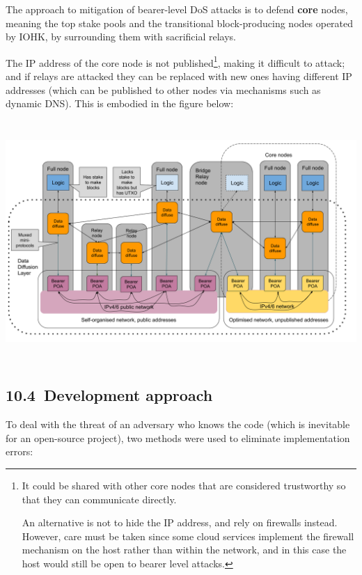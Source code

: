 \documentclass[11pt,a4paper]{article}
\begin{document}
The approach to mitigation of bearer-level DoS attacks is to defend
\textbf{core} nodes, meaning the top stake pools and the transitional
block-producing nodes operated by IOHK, by surrounding them with
sacrificial relays.

The IP address of the core node is not published\footnote{It could be
  shared with other core nodes that are considered trustworthy so that
  they can communicate directly.

  An alternative is not to hide the IP address, and rely on firewalls
  instead. However, care must be taken since some cloud services
  implement the firewall mechanism on the host rather than within the
  network, and in this case the host would still be open to bearer level
  attacks.}, making it difficult to attack; and if relays are attacked
they can be replaced with new ones having different IP addresses (which
can be published to other nodes via mechanisms such as dynamic DNS).
This is embodied in the figure below:

\includegraphics[width=6.26772in,height=3.61111in]{./media/image5.png}

\hypertarget{development-approach}{%
\subsection{​10.4​~Development approach}\label{development-approach}}

To deal with the threat of an adversary who knows the code (which is
inevitable for an open-source project), two methods were used to
eliminate implementation errors:
\end{document}
